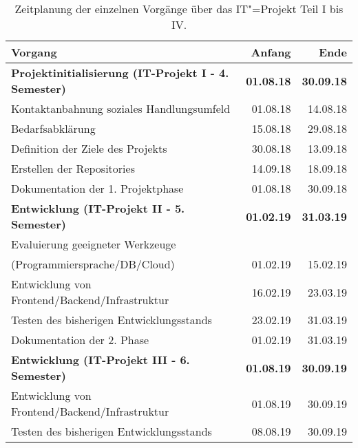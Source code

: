 \begin{table}[htp]
  \caption{Zeitplanung der einzelnen Vorgänge über das IT"=Projekt Teil I bis IV.}
  \bgroup
  \def\arraystretch{1.5}%
  \begin{tabular}{|l|r|r|}
    \hline
    \textbf{Vorgang}                                              & \textbf{Anfang}   & \textbf{Ende} \\ \hline
    \textbf{Projektinitialisierung (IT-Projekt I - 4. Semester)}   & \textbf{01.08.18} & \textbf{30.09.18} \\ \hline
    Kontaktanbahnung soziales Handlungsumfeld                     & 01.08.18          & 14.08.18 \\ \hline
    Bedarfsabklärung                                              & 15.08.18          & 29.08.18 \\ \hline
    Definition der Ziele des Projekts                             & 30.08.18          & 13.09.18 \\ \hline
    Erstellen der Repositories                                    & 14.09.18          & 18.09.18 \\ \hline
    Dokumentation der 1. Projektphase                             & 01.08.18          & 30.09.18 \\ \hline
    \textbf{Entwicklung (IT-Projekt II - 5. Semester)}             & \textbf{01.02.19} & \textbf{31.03.19} \\ \hline
    Evaluierung geeigneter Werkzeuge                              & & \\ 
    (Programmiersprache/DB/Cloud)                                 & 01.02.19          & 15.02.19 \\ \hline
    Entwicklung von Frontend/Backend/Infrastruktur                & 16.02.19          & 23.03.19 \\ \hline
    Testen des bisherigen Entwicklungsstands                      & 23.02.19          & 31.03.19 \\ \hline
    Dokumentation der 2. Phase                                    & 01.02.19          & 31.03.19 \\ \hline
    \textbf{Entwicklung (IT-Projekt III - 6. Semester)}            & \textbf{01.08.19} & \textbf{30.09.19} \\ \hline
    Entwicklung von Frontend/Backend/Infrastruktur                & 01.08.19          & 30.09.19 \\ \hline
    Testen des bisherigen Entwicklungsstands                      & 08.08.19          & 30.09.19 \\ \hline

\end{tabular}
\end{table}

